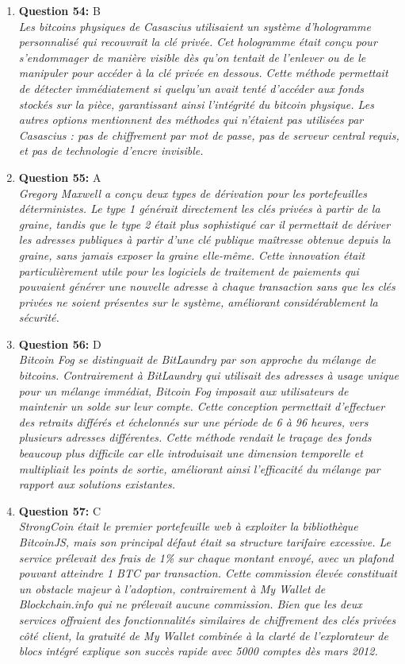 \documentclass[12pt,a4paper]{article}
\begin{document}
\begin{enumerate}
\item \textbf{Question 54:} B
\\ \textit{Les bitcoins physiques de Casascius utilisaient un système d'hologramme personnalisé qui recouvrait la clé privée. Cet hologramme était conçu pour s'endommager de manière visible dès qu'on tentait de l'enlever ou de le manipuler pour accéder à la clé privée en dessous. Cette méthode permettait de détecter immédiatement si quelqu'un avait tenté d'accéder aux fonds stockés sur la pièce, garantissant ainsi l'intégrité du bitcoin physique. Les autres options mentionnent des méthodes qui n'étaient pas utilisées par Casascius : pas de chiffrement par mot de passe, pas de serveur central requis, et pas de technologie d'encre invisible.}

\item \textbf{Question 55:} A
\\ \textit{Gregory Maxwell a conçu deux types de dérivation pour les portefeuilles déterministes. Le type 1 générait directement les clés privées à partir de la graine, tandis que le type 2 était plus sophistiqué car il permettait de dériver les adresses publiques à partir d'une clé publique maîtresse obtenue depuis la graine, sans jamais exposer la graine elle-même. Cette innovation était particulièrement utile pour les logiciels de traitement de paiements qui pouvaient générer une nouvelle adresse à chaque transaction sans que les clés privées ne soient présentes sur le système, améliorant considérablement la sécurité.}

\item \textbf{Question 56:} D
\\ \textit{Bitcoin Fog se distinguait de BitLaundry par son approche du mélange de bitcoins. Contrairement à BitLaundry qui utilisait des adresses à usage unique pour un mélange immédiat, Bitcoin Fog imposait aux utilisateurs de maintenir un solde sur leur compte. Cette conception permettait d'effectuer des retraits différés et échelonnés sur une période de 6 à 96 heures, vers plusieurs adresses différentes. Cette méthode rendait le traçage des fonds beaucoup plus difficile car elle introduisait une dimension temporelle et multipliait les points de sortie, améliorant ainsi l'efficacité du mélange par rapport aux solutions existantes.}

\item \textbf{Question 57:} C
\\ \textit{StrongCoin était le premier portefeuille web à exploiter la bibliothèque BitcoinJS, mais son principal défaut était sa structure tarifaire excessive. Le service prélevait des frais de 1\% sur chaque montant envoyé, avec un plafond pouvant atteindre 1 BTC par transaction. Cette commission élevée constituait un obstacle majeur à l'adoption, contrairement à My Wallet de Blockchain.info qui ne prélevait aucune commission. Bien que les deux services offraient des fonctionnalités similaires de chiffrement des clés privées côté client, la gratuité de My Wallet combinée à la clarté de l'explorateur de blocs intégré explique son succès rapide avec 5000 comptes dès mars 2012.}


\end{enumerate}
\end{document}
